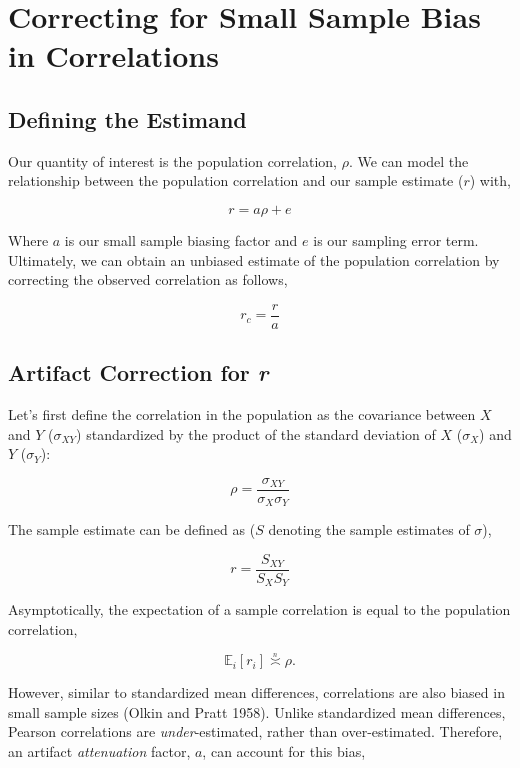 \documentclass[
  letterpaper,
  DIV=11,
  numbers=noendperiod]{scrreprt}
\begin{document}
\section{Correcting for Small Sample Bias in
Correlations}\label{correcting-for-small-sample-bias-in-correlations}

\subsection{Defining the Estimand}\label{defining-the-estimand}

Our quantity of interest is the population correlation, \(\rho\). We can
model the relationship between the population correlation and our sample
estimate (\(r\)) with,

\[
r = a\rho+e
\]

Where \(a\) is our small sample biasing factor and \(e\) is our sampling
error term. Ultimately, we can obtain an unbiased estimate of the
population correlation by correcting the observed correlation as
follows,

\[
r_c = \frac{r}{a}
\]

\subsection{\texorpdfstring{Artifact Correction for
\emph{r}}{Artifact Correction for r}}\label{artifact-correction-for-r}

Let's first define the correlation in the population as the covariance
between \(X\) and \(Y\) (\(\sigma_{XY}\)) standardized by the product of
the standard deviation of \(X\) (\(\sigma_X\)) and \(Y\) (\(\sigma_Y\)):

\[
\rho = \frac{\sigma_{XY}}{\sigma_{X}\sigma_Y}
\]

The sample estimate can be defined as (\(S\) denoting the sample
estimates of \(\sigma\)),

\[
r = \frac{S_{XY}}{S_{X}S_Y}
\]

Asymptotically, the expectation of a sample correlation is equal to the
population correlation,

\[
\mathbb{E}_i[r_i] \overset{_n}{\asymp} \rho.
\]

However, similar to standardized mean differences, correlations are also
biased in small sample sizes (Olkin and Pratt 1958). Unlike standardized
mean differences, Pearson correlations are \emph{under}-estimated,
rather than over-estimated. Therefore, an artifact \emph{attenuation}
factor, \(a\), can account for this bias,
\end{document}
